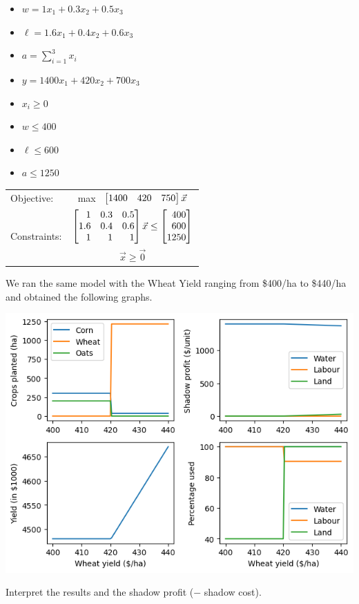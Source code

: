\documentclass{workbook}
\begin{document}
\begin{solution}
\begin{slide}
\begin{parts}
	\item
		\begin{itemize}
			\item $w = 1x_1 + 0.3x_2 + 0.5 x_3$
			\item $\ell = 1.6 x_1 + 0.4 x_2 + 0.6 x_3$
			\item $\displaystyle a = \sum_{i=1}^3 x_i$
			\item $y = 1400 x_1 + 420 x_2 + 700 x_3$
		\end{itemize}
		
	\item 
		\begin{itemize}
			\item $x_i \geq 0$
			\item $w \leq 400$
			\item $\ell \leq 600$
			\item $a \leq 1250$
		\end{itemize}
	\item 	\begin{tabular}[t]{lc}
				Objective: 						& max \ $\mat{1400 & 420 & 750} \vec{x}$ \\
				\multirow{2}{*}{Constraints:} 	& $\mat{1 & 0.3 & 0.5\\1.6 & 0.4 & 0.6\\1 & 1 & 1} \vec{x} \leq \mat{400\\600\\1250}$ \\
							& $\vec{x} \geq \vec{0}$
			\end{tabular}
\end{parts}
\end{slide}
\end{solution}

\begin{slide}

We ran the same model with the Wheat Yield ranging from \$400/ha to \$440/ha and obtained the following graphs.
\begin{center}
	\includegraphics[width=.5\textwidth]{images/farm-linearprog.png}
\end{center}

\begin{parts}
	\setcounter{partsitem}{4}
	\item Interpret the results and the shadow profit ($-$ shadow cost).
\end{parts}
\end{slide}
\end{document}
